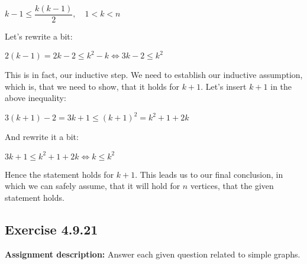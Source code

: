\documentclass{report}
\newcommand{\cent}[1]{\begin{center}#1\end{center}}
\newcommand{\assignmentDescription}{\textbf{Assignment description: }}
\newcommand{\Exercise}[1]{\subsection{Exercise #1}}
\begin{document}
	\cent{$k-1 \leq \dfrac{k(k-1)}{2}, \quad 1 < k < n$}
	
	Let's rewrite a bit:
	
	\cent{$2(k-1) = 2k-2 \leq k^2 - k \Leftrightarrow 3k-2 \leq k^2$}
	
	This is in fact, our inductive step. We need to establish our inductive assumption, which is, that we need to show, that it holds for $k+1$. Let's insert $k+1$ in the above inequality:
	
	\cent{$3(k+1)-2 = 3k+1 \leq (k+1)^2 = k^2 + 1 + 2k$}
	
	And rewrite it a bit:
	
	\cent{$3k+1 \leq  k^2 + 1 + 2k \Leftrightarrow k \leq k^2$}
	
	Hence the statement holds for $k+1$. This leads us to our final conclusion, in which we can safely assume, that it will hold for $n$ vertices, that the given statement holds.
	
	\Exercise{4.9.21}
	
	\assignmentDescription
	Answer each given question related to simple graphs.
	
\end{document}
